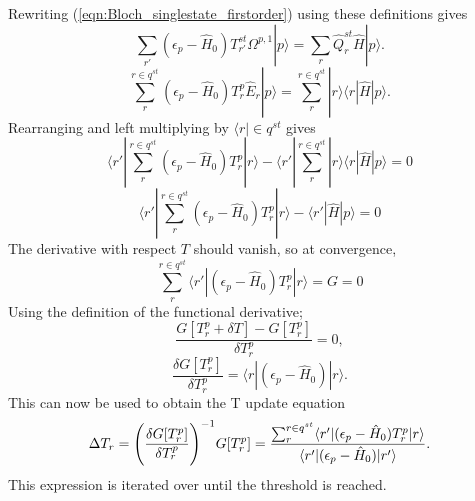 \noindent Rewriting (\ref{eqn:Bloch_singlestate_firstorder}) using these definitions gives
\begin{equation}
\sum_{r'}(\epsilon_{p} - \hat{H}_{0} )T_{r'}^{st} \Omega^{p,1}|p\rangle = \sum_{r}\hat{Q}^{st}_{r}\hat{H}|p\rangle .
\label{eqn:Bloch_singlestate_firstorder_st}
\end{equation}
\begin{equation*}
\sum_{r}^{r\in q^{st}} (\epsilon_{p} - \hat{H}_{0} )T_{r}^{p} \hat{E}_{r} | p \rangle 
= 
\sum_{r}^{r\in q^{st}} |r \rangle \langle r | \hat{H}|p\rangle .
\end{equation*}
Rearranging and left multiplying by $\langle r | \in q^{st}$ gives  
\begin{equation*}
\langle r' | \sum_{r}^{r\in q^{st}} (\epsilon_{p} - \hat{H}_{0} )T_{r}^{p} | r \rangle 
-
\langle r' | \sum_{r}^{r\in q^{st}} | r \rangle \langle r | \hat{H} |p\rangle = 0
\end{equation*}
\begin{equation}
\langle r' | \sum_{r}^{r\in q^{st}} (\epsilon_{p} - \hat{H}_{0} )T_{r}^{p} | r \rangle 
-
\langle r' | \hat{H} |p\rangle = 0
\label{eqn:Amplitude_eqn}
\end{equation}
The derivative with respect $T$ should vanish, so at convergence,
\begin{equation}
\sum_{r}^{r\in q^{st}} \langle r' |(\epsilon_{p} - \hat{H}_{0} )T_{r}^{p} | r \rangle = G = 0 
\label{eqn:caspt2_residual}
\end{equation}
Using the definition of the functional derivative;
\begin{equation*}
\frac{G[T_{r}^{p} + \delta T ] - G[T_{r}^{p}]}{ \delta T_{r}^{p} } = 0,
\end{equation*}
\begin{equation}
\frac{\delta G[T^{p}_{r}]} { \delta T^{p}_{r}}  = 
\langle r |(\epsilon_{p} - \hat{H}_{0} )| r \rangle.
\end{equation}
This can now be used to obtain the T update equation
\begin{equation}
\Delta T_{r} = \Bigg{(}\frac{\delta G[T^{p}_{r}]} { \delta T^{p}_{r}}\Bigg{)}^{-1}G[T^{p}_{r}]  = 
\frac{\sum_{r}^{r\in q^{st}} \langle r' |(\epsilon_{p} - \hat{H}_{0} )T_{r}^{p} | r \rangle} 
{\langle r' |(\epsilon_{p} - \hat{H}_{0} )| r' \rangle}.
\label{eqn:T_update}
\end{equation}
This expression is iterated over until the threshold is reached. 

